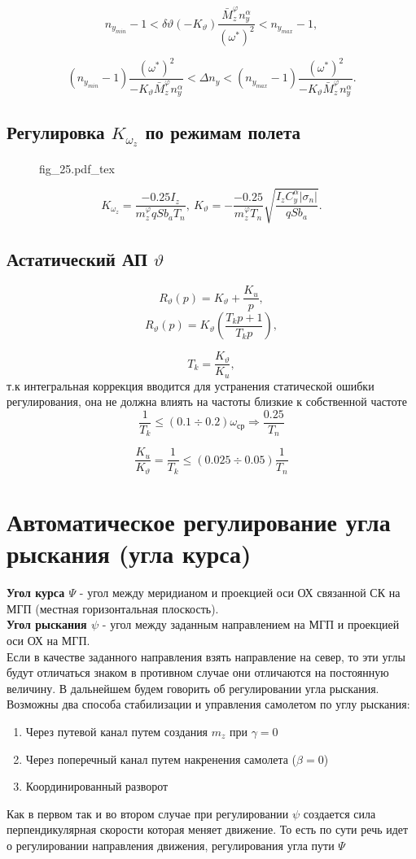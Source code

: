 \documentclass{article}
\begin{document}
\[
	n_{{y}_{min}} - 1<  \delta \vartheta (- K_\vartheta)\frac{\bar{M}_z^\varphi
		n_y^\alpha}{(\omega^*)^2} < n_{{y}_{max}} - 1,
\]

\[
	(n_{{y}_{min}} - 1)\frac{(\omega^*)^2}{-K_{\vartheta}\bar{M}_z^\varphi
	n_y^\alpha}< \Delta n_y< (n_{{y}_{max}} - 1)
	\frac{(\omega^*)^2}{-K_{\vartheta}\bar{M}_z^\varphi n_y^\alpha}.
\]

\subsection{Регулировка \texorpdfstring{$K_{\omega_z}$}{Lg} по режимам полета}
\begin{figure}[H]
	\centering
	{fig_25.pdf_tex}
\end{figure}
\[
	K_{\omega_z}  =\frac{-0.25 I_z}{m_z^\varphi q S b_a T_n}, \ K_{\vartheta}
	= - \frac{-0.25}{m_z^\varphi T_n} \sqrt{\frac{I_z C_y^\alpha
			|\sigma_n|}{qSb_a}}.
\]

\subsection{Астатический АП \texorpdfstring{$\vartheta$}{Lg}}
\[
	R_{\vartheta}(p) = K_\vartheta + \frac{K_u}{p},
\]
\[
	R_{\vartheta}(p) = K_\vartheta(\frac{T_k p  + 1 }{T_k p}),
\]

\[
	T_k = \frac{K_\vartheta}{K_u},
\]
т.к интегральная коррекция вводится для устранения статической ошибки
регулирования, она не должна влиять на частоты близкие к собственной частоте
\[
	\frac{1}{T_k} \leq (0.1 \div 0.2) \omega_\text{ср} \Rightarrow
	\frac{0.25}{T_n}
\]

\[
	\frac{K_u}{K_\vartheta} =  \frac{1}{T_k} \leq (0.025 \div 0.05)
	\frac{1}{T_n}
\]
\section{Автоматическое регулирование угла рыскания (угла курса)}
\textbf{Угол курса $\Psi$} - угол между меридианом и проекцией оси ОХ связанной
СК на МГП (местная горизонтальная плоскость).\\
\textbf{Угол рыскания $\psi$} - угол между заданным направлением на МГП и
проекцией оси ОХ на МГП.\\
Если в качестве заданного направления взять направление на север, то эти углы
будут отличаться знаком в противном случае они отличаются на постоянную
величину. В дальнейшем будем говорить об регулировании угла рыскания. Возможны
два способа стабилизации и управления самолетом по углу рыскания:
\begin{enumerate}
	\item Через путевой канал путем создания $m_z$ при $\gamma = 0$
	\item Через поперечный канал путем накренения самолета ($\beta = 0$)
	\item Координированный разворот
\end{enumerate}
Как в первом так и во втором случае при регулировании $\psi$ создается сила
перпендикулярная скорости которая меняет движение. То есть по сути речь идет о
регулировании направления движения, регулирования угла пути $\Psi$
\end{document}
